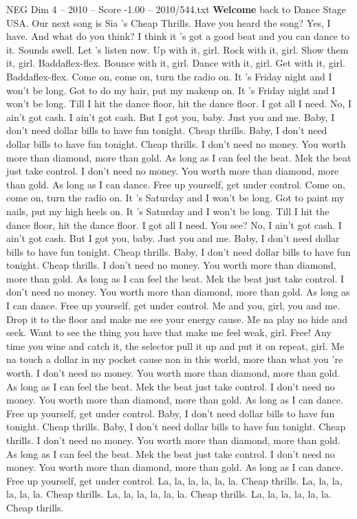\begin{textsample}{NEG Dim 4 – 2010 – Score -1.00 – 2010/544.txt}  \label{ex:f4_neg_013}
\textbf{Welcome} back to Dance Stage USA.
Our next song is Sia 's Cheap Thrills.
Have you heard the song?
Yes, I have.
And what do you think?
I think it 's got a good beat and you can dance to it.
Sounds swell.
Let 's listen now.
Up with it, girl.
Rock with it, girl.
Show them it, girl.
Baddaflex-flex.
Bounce with it, girl.
Dance with it, girl.
Get with it, girl.
Baddaflex-flex.
Come on, come on, turn the radio on.
It 's Friday night and I won't be long.
Got to do my hair, put my makeup on.
It 's Friday night and I won't be long.
Till I hit the dance floor, hit the dance floor.
I got all I need.
No, I ain't got cash.
I ain't got cash.
But I got you, baby.
Just you and me.
Baby, I don't need dollar bills to have fun tonight.
Cheap thrills.
Baby, I don't need dollar bills to have fun tonight.
Cheap thrills.
I don't need no money.
You worth more than diamond, more than gold.
As long as I can feel the beat.
Mek the beat just take control.
I don't need no money.
You worth more than diamond, more than gold.
As long as I can dance.
Free up yourself, get under control.
Come on, come on, turn the radio on.
It 's Saturday and I won't be long.
Got to paint my nails, put my high heels on.
It 's Saturday and I won't be long.
Till I hit the dance floor, hit the dance floor.
I got all I need.
You see?
No, I ain't got cash.
I ain't got cash.
But I got you, baby.
Just you and me.
Baby, I don't need dollar bills to have fun tonight.
Cheap thrills.
Baby, I don't need dollar bills to have fun tonight.
Cheap thrills.
I don't need no money.
You worth more than diamond, more than gold.
As long as I can feel the beat.
Mek the beat just take control.
I don't need no money.
You worth more than diamond, more than gold.
As long as I can dance.
Free up yourself, get under control.
Me and you, girl, you and me.
Drop it to the floor and make me see your energy cause.
Me na play no hide and seek.
Want to see the thing you have that make me feel weak, girl.
Free!
Any time you wine and catch it, the selector pull it up and put it on repeat, girl.
Me na touch a dollar in my pocket cause non in this world, more than what you 're worth.
I don't need no money.
You worth more than diamond, more than gold.
As long as I can feel the beat.
Mek the beat just take control.
I don't need no money.
You worth more than diamond, more than gold.
As long as I can dance.
Free up yourself, get under control.
Baby, I don't need dollar bills to have fun tonight.
Cheap thrills.
Baby, I don't need dollar bills to have fun tonight.
Cheap thrills.
I don't need no money.
You worth more than diamond, more than gold.
As long as I can feel the beat.
Mek the beat just take control.
I don't need no money.
You worth more than diamond, more than gold.
As long as I can dance.
Free up yourself, get under control.
La, la, la, la, la, la.
Cheap thrills.
La, la, la, la, la, la.
Cheap thrills.
La, la, la, la, la, la.
Cheap thrills.
La, la, la, la, la, la.
Cheap thrills.

\end{textsample}
